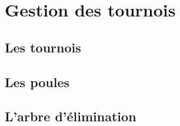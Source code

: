 \section{Gestion des tournois}

\subsection{Les tournois}

\subsection{Les poules}

\subsection{L'arbre d'élimination}